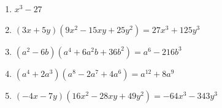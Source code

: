 \documentclass{bis}
\begin{document}
\begin{solution}
\begin{enumerate}
  \item \(x^3-27\)
  \item \((3x+5y)(9x^2-15xy+25y^2)=27x^3+125y^3\)
  \item \((a^2-6b)(a^4+6a^2b+36b^2)=a^6-216b^3\)
  \item \((a^4+2a^3)(a^8-2a^7+4a^6)=a^{12}+8a^9\)
  \item \(({-}4x-7y)(16x^2-28xy+49y^2)={-}64x^3-343y^3\)
\end{enumerate}
\end{solution}

\oplossingen
\end{document}

